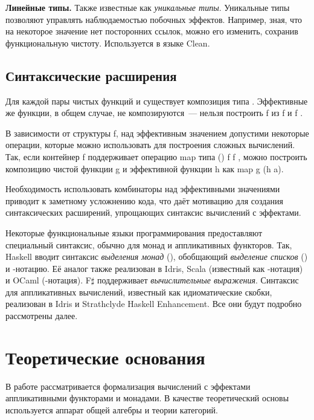 \textbf{Линейные типы.} Также известные как \emph{уникальные типы}\cite{Barendsen1996}. Уникальные типы позволяют управлять наблюдаемостью побочных эффектов. Например, зная, что на некоторое значение нет посторонних ссылок, можно его изменить, сохранив функциональную чистоту. Используется в языке Clean\cite{Brus1987}.

\section{Синтаксические расширения}
Для каждой пары чистых функций \<\alpha \to \beta\> и \<\beta \to \gamma\> существует композиция типа \<\alpha \to \gamma\>. Эффективные же функции, в общем случае, не композируются~--- нельзя построить \<\alpha \to f \gamma\> из \<\alpha \to f \beta\> и \<\beta \to f \gamma\>.

В зависимости от структуры \<f\>, над эффективным значением допустими некоторые операции, которые можно использовать для построения сложных вычислений. Так, если контейнер \<f \alpha\> поддерживает операцию \<map\> типа \<(\alpha \to \beta) \to f \alpha \to f \beta\>, можно построить композицию чистой функции \<g\> и эффективной функции \<h\> как \<map g (h a)\>.

Необходимость использовать комбинаторы над эффективными значениями приводит к заметному усложнению кода, что даёт мотивацию для создания синтаксических расширений, упрощающих синтаксис вычислений с эффектами. 

Некоторые функциональные языки программирования предоставляют специальный синтаксис, обычно для монад и аппликативных функторов. Так, Haskell вводит синтаксис \emph{выделения монад} (), обобщающий \emph{выделение списков} () и \<\>-нотацию. Её аналог также реализован в Idris\cite{Brady2008}, Scala (известный как \<\>-нотация) и OCaml (\<\>-нотация). F$\sharp$ поддерживает \emph{вычислительные выражения}. Синтаксис для аппликативных вычислений, известный как идиоматические скобки, реализован в Idris и Strathclyde Haskell Enhancement. Все они будут подробно рассмотрены далее.

\chapter{Теоретические основания}
В работе рассматривается формализация вычислений с эффектами аппликативными функторами и монадами. В качестве теоретический основы используется аппарат общей алгебры и теории категорий.

